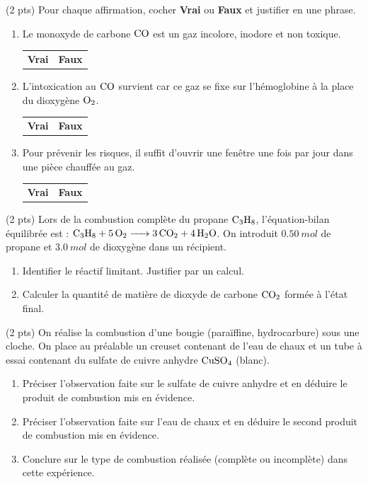 \documentclass[11pt]{article}
\begin{document}
\begin{exercice} \hfill (2 pts)
Pour chaque affirmation, cocher \textbf{Vrai} ou \textbf{Faux} et justifier en une phrase.
\begin{enumerate}
    \item Le monoxyde de carbone $\ce{CO}$ est un gaz incolore, inodore et non toxique.
    \begin{tabular}{cc} \textbf{Vrai} & \textbf{Faux} \end{tabular}
    \item L'intoxication au $\ce{CO}$ survient car ce gaz se fixe sur l'hémoglobine à la place du dioxygène $\ce{O2}$.
    \begin{tabular}{cc} \textbf{Vrai} & \textbf{Faux} \end{tabular}
    \item Pour prévenir les risques, il suffit d'ouvrir une fenêtre une fois par jour dans une pièce chauffée au gaz.
    \begin{tabular}{cc} \textbf{Vrai} & \textbf{Faux} \end{tabular}
\end{enumerate}
\end{exercice}

\begin{exercice} \hfill (2 pts)
Lors de la combustion complète du propane $\ce{C3H8}$, l'équation-bilan équilibrée est :
$\ce{C3H8 + 5 O2 -> 3 CO2 + 4 H2O}$.
On introduit $\SI{0,50}{mol}$ de propane et $\SI{3,0}{mol}$ de dioxygène dans un récipient.
\begin{enumerate}
    \item Identifier le réactif limitant. Justifier par un calcul.
    \item Calculer la quantité de matière de dioxyde de carbone $\ce{CO2}$ formée à l'état final.
\end{enumerate}
\end{exercice}

\begin{exercice} \hfill (2 pts)
On réalise la combustion d'une bougie (paraïffine, hydrocarbure) sous une cloche. On place au préalable un creuset contenant de l'eau de chaux et un tube à essai contenant du sulfate de cuivre anhydre $\ce{CuSO4}$ (blanc).
\begin{enumerate}
    \item Préciser l'observation faite sur le sulfate de cuivre anhydre et en déduire le produit de combustion mis en évidence.
    \item Préciser l'observation faite sur l'eau de chaux et en déduire le second produit de combustion mis en évidence.
    \item Conclure sur le type de combustion réalisée (complète ou incomplète) dans cette expérience.
\end{enumerate}
\end{exercice}
\end{document}
